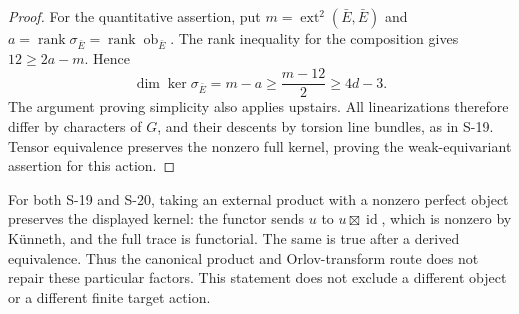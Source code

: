 \begin{proof}
For the quantitative assertion, put
$m=\operatorname{ext}^2(\bar E,\bar E)$ and
$a=\operatorname{rank}\sigma_{\bar E}
=\operatorname{rank}\operatorname{ob}_{\bar E}$.
The rank inequality for the composition gives
$12\ge2a-m$. Hence
\[
 \dim\ker\sigma_{\bar E}=m-a
 \ge\frac{m-12}{2}\ge4d-3.
\]
The argument proving simplicity also applies upstairs.
All linearizations therefore differ by characters of $G$,
and their descents by torsion line bundles, as in S-19.
Tensor equivalence preserves the nonzero full kernel,
proving the weak-equivariant assertion for this action.
\end{proof}

For both S-19 and S-20, taking an external product with a
nonzero perfect object preserves the displayed kernel:
the functor sends $u$ to $u\boxtimes\operatorname{id}$,
which is nonzero by K\"unneth, and the full trace is functorial.
The same is true after a derived equivalence.
Thus the canonical product and Orlov-transform route does not
repair these particular factors. This statement does not
exclude a different object or a different finite target action.

